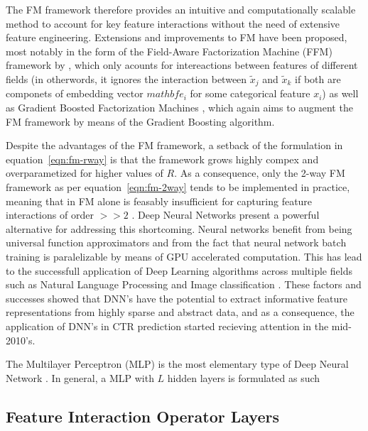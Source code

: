 \documentclass{mldsmsc}
\begin{document}
The FM framework therefore provides an intuitive and computationally scalable method to
account for key feature interactions without the need of extensive feature engineering. Extensions
and improvements to FM have been proposed, most notably in the form of
the Field-Aware Factorization Machine (FFM) framework by \cite{RefWorks:juan2016field-aware},
which only acounts for intereactions between features of different fields 
(in otherwords, it ignores the interaction between $\tilde{x}_j$ and $\tilde{x}_k$ if
both are componets of embedding vector $mathbf{e}_i$ for some categorical feature $x_i$)
as well as Gradient Boosted Factorization Machines \citep{RefWorks:cheng2014gradient}, 
which again aims to augment the FM framework by means of the Gradient Boosting algorithm.

Despite the advantages of the FM framework, a setback of the formulation in equation~\ref{eqn:fm-rway}
is that the framework grows highly compex and overparametized for higher values of $R$.
As a consequence, only the 2-way FM framework as per equation~\ref{eqn:fm-2way} tends to be
implemented in practice, meaning that in FM alone is feasably insufficient for capturing
feature interactions of order $>>2$ \citep{RefWorks:guo2017deepfm:}. Deep Neural Networks
present a powerful alternative for addressing this shortcoming. Neural networks benefit from
being universal function approximators \citep{RefWorks:cybenko1989approximation} and from the
fact that neural network batch training is paralelizable by means of GPU accelerated computation.
This has lead to the successfull application of Deep Learning algorithms across multiple fields
such as Natural Language Processing and Image classification 
\citep{RefWorks:he2016deep,RefWorks:krizhevsky2017imagenet,RefWorks:lecun1998gradient-based}. 
These factors and successes showed that DNN's have the potential to extract informative
feature representations from highly sparse and abstract data, and as a consequence,
the application of DNN's in CTR prediction started recieving attention in the mid-2010's.

The Multilayer Perceptron (MLP) \label{ref:mlp} is the most elementary type of Deep Neural Network
\citep{RefWorks:webster2024week}. In general, a MLP with $L$ hidden layers is formulated as such

\subsection{Feature Interaction Operator Layers}
\end{document}
